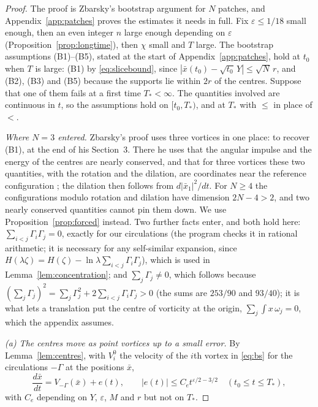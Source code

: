 \documentclass[11pt]{article}
\theoremstyle{definition}
\begin{document}
\begin{proof}
The proof is Zbarsky's bootstrap argument \cite[Sects.~3--5]{zbarsky2021} for $N$ patches, and Appendix~\ref{app:patches} proves the estimates it needs in full. Fix $\varepsilon \le 1/18$ small enough, then an even integer $n$ large enough depending on $\varepsilon$ (Proposition~\ref{prop:longtime}), then $\chi$ small and $T$ large. The bootstrap assumptions (B1)--(B5), stated at the start of Appendix~\ref{app:patches}, hold at $t_0$ when $T$ is large: (B1) by \eqref{eq:slicebound}, since $|\bar x(t_0) - \sqrt{t_0}\,Y| \le \sqrt N\,r$, and (B2), (B3) and (B5) because the supports lie within $2r$ of the centres. Suppose that one of them fails at a first time $T_* < \infty$. The quantities involved are continuous in $t$, so the assumptions hold on $[t_0, T_*)$, and at $T_*$ with $\le$ in place of $<$.

\emph{Where $N = 3$ entered.} Zbarsky's proof uses three vortices in one place: to recover (B1), at the end of his Section~3. There he uses that the angular impulse and the energy of the centres are nearly conserved, and that for three vortices these two quantities, with the rotation and the dilation, are coordinates near the reference configuration \cite[Lemma~1(ii)]{zbarsky2021}; the dilation then follows from $d|\bar x_1|^2/dt$. For $N \ge 4$ the configurations modulo rotation and dilation have dimension $2N - 4 > 2$, and two nearly conserved quantities cannot pin them down. We use Proposition~\ref{prop:forced} instead. Two further facts enter, and both hold here: $\sum_{i<j}\Gamma_i\Gamma_j = 0$, exactly for our circulations (the program checks it in rational arithmetic; it is necessary for any self-similar expansion, since $H(\lambda\zeta) = H(\zeta) - \ln\lambda\sum_{i<j}\Gamma_i\Gamma_j$), which is used in Lemma~\ref{lem:concentration}; and $\sum_j\Gamma_j \ne 0$, which follows because $(\sum_j\Gamma_j)^2 = \sum_j\Gamma_j^2 + 2\sum_{i<j}\Gamma_i\Gamma_j > 0$ (the sums are $253/90$ and $93/40$); it is what lets a translation put the centre of vorticity at the origin, $\sum_j\int x\,\omega_j = 0$, which the appendix assumes.

\emph{(a) The centres move as point vortices up to a small error.} By Lemma~\ref{lem:centres}, with $V_i^0$ the velocity of the $i$th vortex in \eqref{eq:bs} for the circulations $-\Gamma$ at the positions $\bar x$,
\[
  \frac{d\bar x}{dt} = V_{-\Gamma}(\bar x) + e(t),\qquad |e(t)| \le C_et^{\varepsilon/2 - 3/2}\quad(t_0 \le t \le T_*),
\]
with $C_e$ depending on $Y$, $\varepsilon$, $M$ and $r$ but not on $T_*$.


\end{proof}
\end{document}
